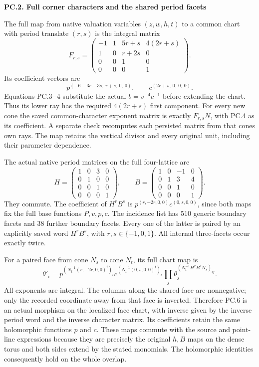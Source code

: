 \par

\medskip\noindent\textbf{PC.2. Full corner characters and the shared period facets}

\par\nobreak

The full map from native valuation variables \((z,w,h,t)\) to a
common chart with period translate \((r,s)\) is the integral matrix
\[
 F_{r,s}=
 \begin{pmatrix}
 -1&1&5r+s&4(2r+s)\\
 1&0&r+2s&0\\
 0&0&1&0\\
 0&0&0&1
 \end{pmatrix}.
\tag{PC.3}
\]
Its coefficient vectors are
\[
 p^{(-6-3r-3s,\ r+s,\ 0,\ 0)},\qquad
 c^{(2r+s,\ 0,\ 0,\ 0)}.
\tag{PC.4}
\]
Equations PC.3-\/-4 substitute the actual \(b=v^{-4}c^{-1}\)
before extending the chart. Thus its lower ray has the required
\(4(2r+s)\) first component. For every new cone the saved
common-character exponent matrix is exactly \(F_{r,s}N\),
with PC.4 as its coefficient. A separate check recomputes each
persisted matrix from that cone\textquotesingle s own rays. The map retains the
vertical divisor and every original unit, including their parameter
dependence.

The actual native period matrices on the full four-lattice are
\[
 H=\begin{pmatrix}1&0&3&0\\0&1&0&0\\0&0&1&0\\0&0&0&1\end{pmatrix},
 \qquad
 B=\begin{pmatrix}1&0&-1&0\\0&1&3&4\\0&0&1&0\\0&0&0&1\end{pmatrix}.
\tag{PC.5}
\]
They commute. The coefficient of \(H^rB^s\) is
\(p^{(r,-2r,0,0)}c^{(0,s,0,0)}\), since both maps fix
the full base functions \(P,v,p,c\). The incidence list has 510
generic boundary facets and 38 further boundary facets. Every one
of the latter is paired by an explicitly saved word \(H^rB^s\),
with \(r,s\in\{-1,0,1\}\). All internal three-facets occur
exactly twice.

For a paired face from cone \(N_s\) to cone \(N_t\), its full
chart map is
\[
 \theta'_i=p^{(N_t^{-1}(r,-2r,0,0)^t)_i}
 c^{(N_t^{-1}(0,s,0,0)^t)_i}
 \prod_j\theta_j^{(N_t^{-1}H^rB^sN_s)_{ij}}.
\tag{PC.6}
\]
All exponents are integral. The columns along the shared face
are nonnegative; only the recorded coordinate away from that
face is inverted. Therefore PC.6 is an actual morphism on the
localized face chart, with inverse given by the inverse period
word and the inverse character matrix. Its coefficients retain
the same holomorphic functions \(p\) and \(c\). These maps
commute with the source and point-line expressions because they
are precisely the original \(h,B\) maps on the dense torus and
both sides extend by the stated monomials. The holomorphic
identities consequently hold on the whole overlap.

